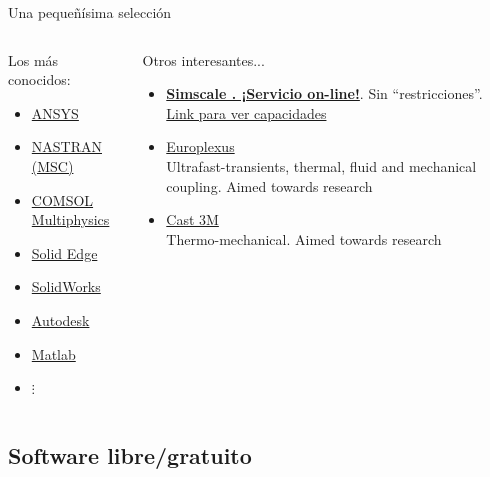 \documentclass[12pt]{beamer}
\begin{document}
\begin{frame}{Una pequeñísima selección}
	\begin{columns}
		\begin{column}{0.5\textwidth}
			Los más conocidos:
			\begin{itemize}
				\item \href{https://www.ansys.com}{ANSYS \textregistered}
				\item \href{https://www.mscsoftware.com}{NASTRAN (MSC) \textregistered}
				\item \href{https://www.comsol.com}{COMSOL Multiphysics \textregistered}
				\item \href{https://solidedge.siemens.com/en/solutions/products/simulation/}{Solid Edge \textregistered}
				\item \href{https://www.solidworks.com/category/simulation-solutions}{SolidWorks \textregistered}
				\item \href{https://www.autodesk.com/solutions/simulation/overview}{Autodesk \textregistered}
				\item \href{https://www.mathworks.com/}{Matlab \textregistered}
				\item $\vdots$
			\end{itemize}
		\end{column}
		\begin{column}{0.6\textwidth}
			Otros interesantes...
			\begin{itemize}
				\item \href{https://www.simscale.com/}{\textbf{Simscale \textregistered. ¡Servicio on-line!}}. Sin ``restricciones''. \href{https://marketing.simscale.com/acton/attachment/14483/f-0336/1/-/-/-/-/SimScale_Simulation_Features_Overview.pdf}{Link para ver capacidades}
				\item \href{https://europlexus.jrc.ec.europa.eu/public/manual_pdf/manual.pdf}{Europlexus \textregistered} \\ Ultrafast-transients, thermal, fluid and mechanical coupling. Aimed towards research
				\item \href{http://www-cast3m.cea.fr/}{Cast 3M \textregistered} \\ Thermo-mechanical. Aimed towards research
			\end{itemize}
		\end{column}
	\end{columns}
\end{frame}

\subsection{Software libre/gratuito}
\end{document}
